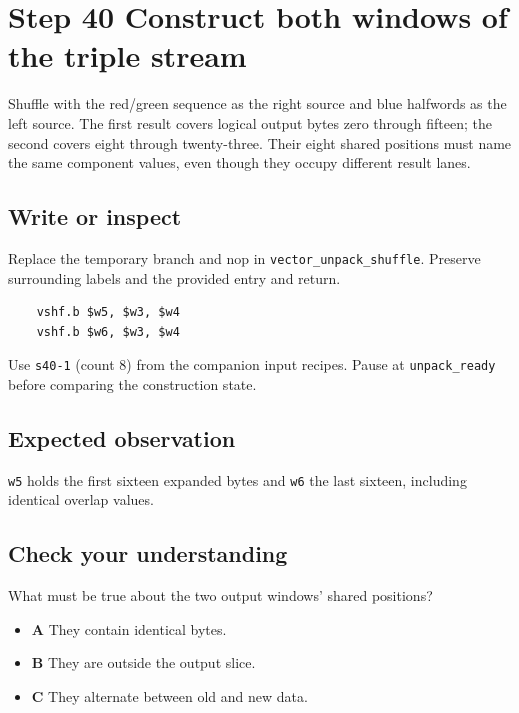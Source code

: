 \section{Step 40 Construct both windows of the triple stream}\label{rgb-s40}

Shuffle with the red/green sequence as the right source and blue halfwords as the left source. The first result covers logical output bytes zero through fifteen; the second covers eight through twenty-three. Their eight shared positions must name the same component values, even though they occupy different result lanes.

\subsection{Write or inspect}
Replace the temporary branch and nop in \texttt{vector\_unpack\_shuffle}. Preserve surrounding labels and the provided entry and return.

\begin{verbatim}
    vshf.b $w5, $w3, $w4
    vshf.b $w6, $w3, $w4
\end{verbatim}
Use \texttt{s40-1} (count 8) from the companion input recipes. Pause at \texttt{unpack\_ready} before comparing the construction state.

\subsection{Expected observation}
\texttt{w5} holds the first sixteen expanded bytes and \texttt{w6} the last sixteen, including identical overlap values.

\subsection{Check your understanding}
What must be true about the two output windows' shared positions?

\begin{itemize}
  \item \textbf{A} They contain identical bytes.
  \item \textbf{B} They are outside the output slice.
  \item \textbf{C} They alternate between old and new data.
\end{itemize}

